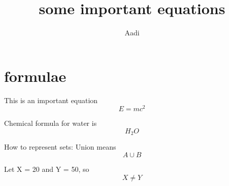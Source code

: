 \documentclass{article}
\begin{document}
	\title{some important equations}
	\author{Aadi}
	
	\section{formulae}
	
	This is an important equation
	\begin{equation}
	E = mc^2	
	\end{equation}
	
	Chemical formula for water is
	\begin{equation}
	H_2O 
	\end{equation}
	
	How to represent sets:
	Union means
	\begin{equation}
	A \cup B
	\end{equation}
	
	Let X = 20 and Y = 50, so
	\begin{equation}
	X \neq Y
	\end{equation}
	
\end{document}
